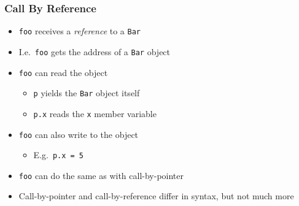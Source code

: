 \begin{frame}
  \frametitle{Call By Reference}
  \begin{itemize}
    \item {\tt foo} receives a \emph{reference} to a {\tt Bar}
    \item I.e.~{\tt foo} gets the address of a {\tt Bar} object
    \item {\tt foo} can read the object
          \begin{itemize}
            \item {\tt p} yields the {\tt Bar} object itself
            \item {\tt p.x} reads the {\tt x} member variable
          \end{itemize}
    \item {\tt foo} can also write to the object
          \begin{itemize}
            \item E.g.~{\tt p.x = 5}
          \end{itemize}
    \item {\tt foo} can do the same as with call-by-pointer
    \item Call-by-pointer and call-by-reference differ in syntax, but not much more
  \end{itemize}
\end{frame}

